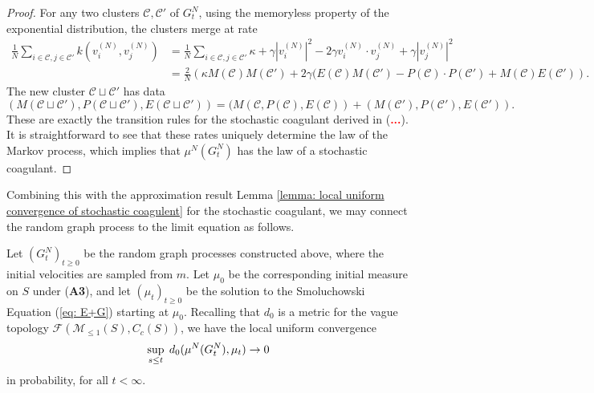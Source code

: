 \begin{proof} For any two clusters $\mathcal{C}, \mathcal{C}'$ of $G^N_t$, using the memoryless property of the exponential distribution, the clusters merge at rate \begin{equation} \begin{split}
    \frac{1}{N}\sum_{i \in \mathcal{C}, j \in \mathcal{C}'} k(v^{(N)}_i, v^{(N)}_j)& = \frac{1}{N}\sum_{i\in \mathcal{C}, j \in \mathcal{C}'} \kappa+\gamma|v^{(N)}_i|^2-2\gamma v^{(N)}_i \cdot v^{(N)}_j + \gamma|v^{(N)}_j|^2 \\ &= \frac{2}{N}\left(\kappa M(\mathcal{C})M(\mathcal{C}') +2\gamma (E(\mathcal{C})M(\mathcal{C}')-P(\mathcal{C})\cdot P(\mathcal{C}')+M(\mathcal{C}) E(\mathcal{C}')\right).
\end{split} \end{equation} The new cluster $\mathcal{C}\sqcup \mathcal{C}'$ has data \begin{equation}
    (M(\mathcal{C}\sqcup \mathcal{C}'), P(\mathcal{C}\sqcup \mathcal{C}'),E(\mathcal{C}\sqcup \mathcal{C}'))=(M(\mathcal{C},P(\mathcal{C}), E(\mathcal{C}))+(M(\mathcal{C}'),P(\mathcal{C}'), E(\mathcal{C}')).
\end{equation}These are exactly the transition rules for the stochastic coagulant derived in (\textcolor{red}{\textbf{...}}). It is straightforward to see that these rates uniquely determine the law of the Markov process, which implies that $\mu^N(G^N_t)$ has the law of a stochastic coagulant. \end{proof} Combining this with the approximation result Lemma \ref{lemma: local uniform convergence of stochastic coagulent} for the stochastic coagulant, we may connect the random graph process to the limit equation as follows. \begin{lemma}\label{lemma: convergence of random graphs} Let $(G^N_t)_{t\ge 0}$ be the random graph processes constructed above, where the initial velocities are sampled from $m$. Let $\mu_0$ be the corresponding initial measure on $S$ under (\textbf{A3}), and let $(\mu_t)_{t\ge 0}$ be the solution to the Smoluchowski Equation (\ref{eq: E+G}) starting at $\mu_0$. Recalling that $d_0$ is a metric for the vague topology $\mathcal{F}(\mathcal{M}_{\le 1}(S), C_c(S))$, we have the local uniform convergence \begin{equation}\sup_{s\le t} \hspace{0.1cm}d_0(\mu^N(G^N_t), \mu_t) \rightarrow 0 \end{equation} in probability, for all $t<\infty.$ \end{lemma} 


